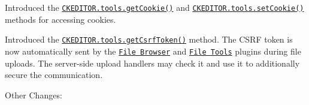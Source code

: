 \begin{DoxyItemize}
\item Introduced the \href{http://docs.ckeditor.com/#!/api/CKEDITOR.tools-method-getCookie}{\tt {\ttfamily C\+K\+E\+D\+I\+T\+O\+R.\+tools.\+get\+Cookie()}} and \href{http://docs.ckeditor.com/#!/api/CKEDITOR.tools-method-setCookie}{\tt {\ttfamily C\+K\+E\+D\+I\+T\+O\+R.\+tools.\+set\+Cookie()}} methods for accessing cookies.
\item Introduced the \href{http://docs.ckeditor.com/#!/api/CKEDITOR.tools-method-getCsrfToken}{\tt {\ttfamily C\+K\+E\+D\+I\+T\+O\+R.\+tools.\+get\+Csrf\+Token()}} method. The C\+S\+RF token is now automatically sent by the \href{http://ckeditor.com/addon/filebrowser}{\tt File Browser} and \href{http://ckeditor.com/addon/filetools}{\tt File Tools} plugins during file uploads. The server-\/side upload handlers may check it and use it to additionally secure the communication.
\end{DoxyItemize}

Other Changes\+:


